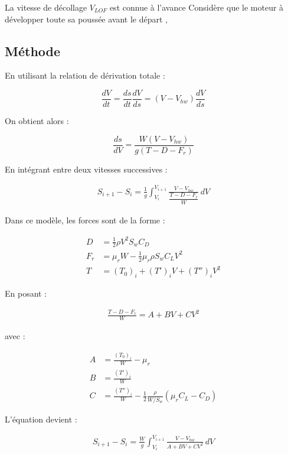 			La vitesse de décollage $V_{LOF}$ est connue à l'avance
			Considère que le moteur à développer toute sa poussée avant le départ ,
		\vspace{0.3cm}
		
		\subsection{Méthode}
			En utilisant la relation de dérivation totale :
			
			\begin{equation}
				\frac{dV}{dt}=\frac{ds}{dt}\frac{dV}{ds}=(V-V_{hw})\frac{dV}{ds}
			\end{equation}
			
			On obtient alors :
			
			\begin{equation}
				\frac{ds}{dV}=\frac{W(V-V_{hw})}{g(T-D-F_r)}
			\end{equation}
			
			En intégrant entre deux vitesses successives :
			
			\begin{align}
				S_{i+1}-S_i= \frac{1}{g} \int_{V_i}^{V_{i+1}} \frac{V-V_{hw}} {\dfrac{T-D-F_r}{W}} \, dV
			\end{align}
			
			Dans ce modèle, les forces sont de la forme :
			
			\begin{align}
				D &= \frac{1}{2}\rho V^2 S_w C_D \\
				F_r &= \mu_r W - \frac{1}{2}\mu_r \rho S_w C_L V^2 \\
				T &= (T_0)_i + (T')_i V + (T'')_i V^2
			\end{align}
			
			En posant :
			
			\begin{align}
				\frac{T-D-F_r}{W}=A+BV+CV^2
			\end{align}
			
			avec :
			
			\begin{align}
				A &= \frac{(T_0)_i}{W}-\mu_r \\
				B &= \frac{(T')_i}{W} \\
				C &= \frac{(T'')_i}{W} 	-\frac{1}{2} \frac{\rho}{W/S_w} (\mu_r C_L-C_D)
			\end{align}
			
			L’équation devient :
			
			\begin{align}
				S_{i+1}-S_i	=	\frac{W}{g}	\int_{V_i}^{V_{i+1}} \frac{V-V_{hw}} {A+BV+CV^2} \, dV
			\end{align}
			
